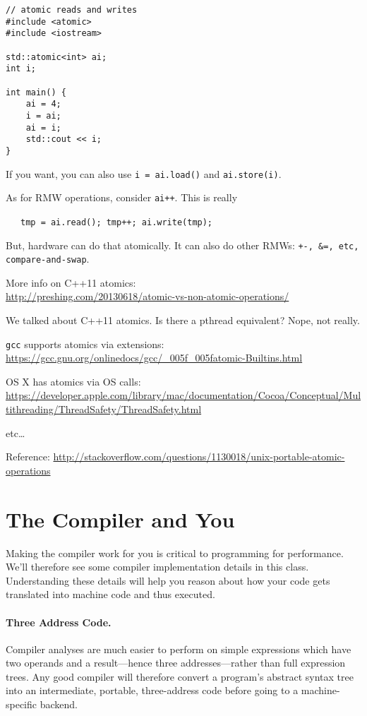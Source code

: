 \begin{verbatim}
// atomic reads and writes
#include <atomic>
#include <iostream>

std::atomic<int> ai;
int i;

int main() {
    ai = 4;
    i = ai;
    ai = i;
    std::cout << i;
}
\end{verbatim}
If you want, you can also use {\tt i = ai.load()} and {\tt ai.store(i)}.

As for RMW operations, consider {\tt ai++}. This is really

~~~{\tt tmp = ai.read(); tmp++; ai.write(tmp); }

But, hardware can do that atomically. It can also do other RMWs: {\tt +-, \&=, etc, compare-and-swap}.

More info on C++11 atomics:\\
\url{http://preshing.com/20130618/atomic-vs-non-atomic-operations/}

We talked about C++11 atomics. Is there a pthread equivalent? Nope, not really.

{\tt gcc} supports atomics via extensions: \\
\url{https://gcc.gnu.org/onlinedocs/gcc/_005f_005fatomic-Builtins.html}

OS X has atomics via OS calls: \\
\url{https://developer.apple.com/library/mac/documentation/Cocoa/Conceptual/Multithreading/ThreadSafety/ThreadSafety.html}

etc\ldots

Reference:
\url{http://stackoverflow.com/questions/1130018/unix-portable-atomic-operations}


\section*{The Compiler and You}
Making the compiler work for you is critical to programming for
performance. We'll therefore see some compiler implementation details
in this class. Understanding these details will help you reason about
how your code gets translated into machine code and thus executed.

\paragraph{Three Address Code.} Compiler analyses are much easier to
perform on simple expressions which have two operands and a
result---hence three addresses---rather than full expression trees.
Any good compiler will therefore convert a program's abstract syntax
tree into an intermediate, portable, three-address code before going
to a machine-specific backend.

